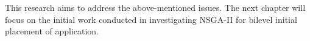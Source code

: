 This research aims to address the above-mentioned issues. The next chapter will focus on the initial work conducted in investigating NSGA-II for bilevel initial placement of application.


















